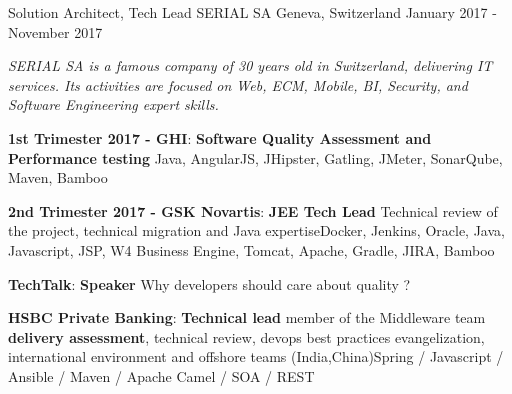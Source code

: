 \begin{cventries}
{\begin{cvitems}
        \end{cvitems}
    }
    \cventry
    {Solution Architect, Tech Lead} %
    {SERIAL SA} %
    {Geneva, Switzerland} %
    {January 2017 - November 2017} %
    {
        \begin{cvitems} %
            \item {\textit{SERIAL SA is a famous company of 30 years old in Switzerland, delivering IT services. Its activities are focused on Web, ECM, Mobile, BI, Security, and Software Engineering expert skills.}}
            \item { \textbf{1st Trimester 2017 - GHI}: \textbf{Software Quality Assessment and Performance testing} \newline Java, AngularJS, JHipster, Gatling, JMeter, SonarQube, Maven, Bamboo}
            \item { \textbf{2nd Trimester 2017 - GSK Novartis}: \textbf{JEE Tech Lead} \newline Technical review of the project, technical migration and Java expertise\newline Docker, Jenkins, Oracle, Java, Javascript, JSP, W4 Business Engine, Tomcat, Apache, Gradle, JIRA, Bamboo}
            \item { \textbf{TechTalk}: \textbf{Speaker} \newline Why developers should care about quality ?}
            \item { \textbf{HSBC Private Banking}: \textbf{Technical lead} \newline member of the Middleware team  \textbf{delivery assessment}, technical review, devops best practices evangelization, international environment and offshore teams (India,China)\newline Spring / Javascript / Ansible / Maven / Apache Camel / SOA / REST}
        \end{cvitems}
    }


\end{cventries}
